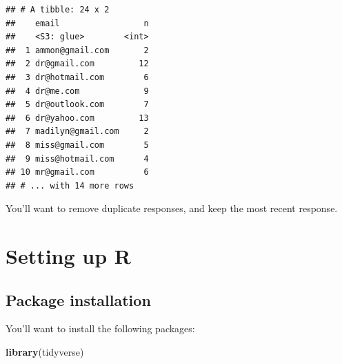 \documentclass[]{book}
\newenvironment{Shaded}{\begin{snugshade}}{\end{snugshade}}
\newcommand{\KeywordTok}[1]{\textcolor[rgb]{0.13,0.29,0.53}{\textbf{#1}}}
\newcommand{\DataTypeTok}[1]{\textcolor[rgb]{0.13,0.29,0.53}{#1}}
\newcommand{\StringTok}[1]{\textcolor[rgb]{0.31,0.60,0.02}{#1}}
\newcommand{\CommentTok}[1]{\textcolor[rgb]{0.56,0.35,0.01}{\textit{#1}}}
\newcommand{\OperatorTok}[1]{\textcolor[rgb]{0.81,0.36,0.00}{\textbf{#1}}}
\newcommand{\NormalTok}[1]{#1}
\begin{document}
\begin{verbatim}
## # A tibble: 24 x 2
##    email                 n
##    <S3: glue>        <int>
##  1 ammon@gmail.com       2
##  2 dr@gmail.com         12
##  3 dr@hotmail.com        6
##  4 dr@me.com             9
##  5 dr@outlook.com        7
##  6 dr@yahoo.com         13
##  7 madilyn@gmail.com     2
##  8 miss@gmail.com        5
##  9 miss@hotmail.com      4
## 10 mr@gmail.com          6
## # ... with 14 more rows
\end{verbatim}

You'll want to remove duplicate responses, and keep the most recent
response.

\begin{Shaded}
\end{Shaded}

\appendix


\chapter{Setting up R}\label{appendixA}

\section{Package installation}\label{package-installation}

You'll want to install the following packages:

\begin{Shaded}
\begin{Highlighting}[]
\KeywordTok{library}\NormalTok{(tidyverse)}
\end{Highlighting}
\end{Shaded}
\end{document}
